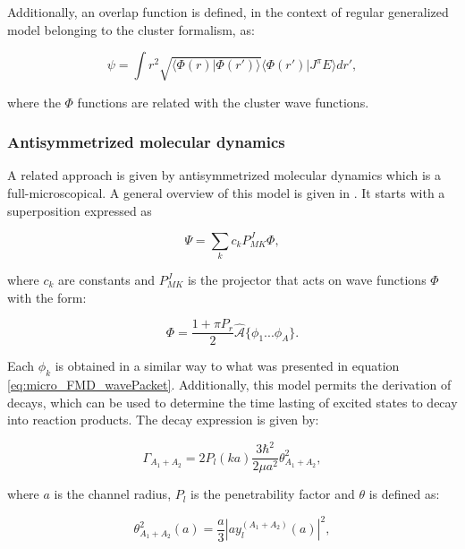 \documentclass[openany]{book}
\begin{document}
Additionally, an overlap function is defined, in the context of regular generalized model belonging to the cluster formalism,  as: 


\begin{equation} \label{eq:micro_FMD_overlap}
	\psi = \int r^2 \sqrt{\langle \Phi(r) | \Phi(r') \rangle } \langle \Phi(r') | J^{\pi} E \rangle dr',
\end{equation}

where the $\Phi$ functions are related with the cluster wave functions. \\

\subsubsection{Antisymmetrized molecular dynamics}

A related approach is given by antisymmetrized molecular dynamics which is a full-microscopical. A general overview of this model is given in \cite{taniguchi_kimura_2021}. It starts with a superposition expressed as 

\begin{equation}\label{eq:middleFusion_AMD_waveFunction}
	\Psi = \sum_k c_k P^{J}_{MK} \Phi,
\end{equation}

where $c_k$ are constants and $P^{J}_{MK}$ is the projector that acts on wave functions $\Phi$ with the form:

\begin{equation}\label{eq:middleFusion_AMD_waves}
	\Phi = \frac{1 + \pi P_r}{2} \hat{\mathcal{A}} \{\phi_1 ... \phi_A\}.
\end{equation}

Each $\phi_k$ is obtained in a similar way to what was presented in equation \ref{eq:micro_FMD_wavePacket}. Additionally, this model permits the derivation of decays, which can be used to determine the time lasting of excited states to decay into reaction products. The decay expression is given by: 

\begin{equation}\label{eq:middleFusion_decayRate}
	\Gamma_{A_1 + A_2} = 2 P_l(ka) \frac{3\hbar^2}{2\mu a^2} \theta^{2}_{A_1 + A_2},
\end{equation}

where $a$ is the channel radius, $P_l$ is the penetrability factor and $\theta$ is defined as: 

\begin{equation}\label{eq:middleFusion_decayRate_theta}
	\theta^{2}_{A_1 + A_2} (a)= \frac{a}{3} \left|ay^{(A_1 + A_2)}_l(a)\right|^2,
\end{equation}
\end{document}
